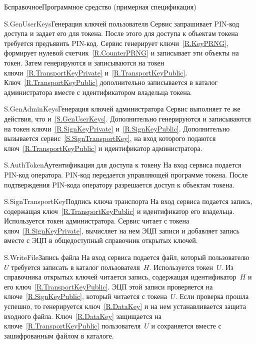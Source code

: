 \begin{appendix}{Б}{справочное}{Программное средство \CryptoDisk 
(примерная спецификация)}
\begin{definition}{S.GenUserKeys}{Генерация ключей пользователя}
Сервис запрашивает PIN-код доступа и задает его для токена.
После этого для доступа к объектам токена требуется предъявить PIN-код.
%
Сервис генерирует ключи~\ref{R.KeyPRNG}, 
формирует нулевой счетчик~\ref{R.CounterPRNG}
и записывает эти объекты на токен. 
Затем генерируются и записываются на токен ключи~\ref{R.TransportKeyPrivate}
и~\ref{R.TransportKeyPublic}.
%
Ключ~\ref{R.TransportKeyPublic} дополнительно записывается 
в каталог администратора вместе с идентификатором владельца токена.
\end{definition}

\begin{definition}{S.GenAdminKeys}{Генерация ключей администратора}
Сервис выполняет те же действия, что и~\ref{S.GenUserKeys}.
Дополнительно генерируются и записываются на токен ключи~\ref{R.SignKeyPrivate}
и~\ref{R.SignKeyPublic}. Дополнительно вызывается 
сервис~\ref{S.SignTransportKey}, на вход которого подаются
ключ~\ref{R.TransportKeyPublic} и идентификатор администратора.
\end{definition}

\clearpage
\begin{definition}{S.AuthToken}{Аутентификация для доступа к токену}
На вход сервиса подается PIN-код оператора.
PIN-код передается управляющей программе токена. 
После подтверждения PIN-кода оператору разрешается доступ к объектам токена.
\end{definition}

\begin{definition}{S.SignTransportKey}{Подпись ключа транспорта}
На вход сервиса подается запись,
содержащая ключ~\ref{R.TransportKeyPublic}
и идентификатор его владельца.
%
Используется токен администратора.
%
Сервис читает с токена ключ~\ref{R.SignKeyPrivate},
вычисляет на нем ЭЦП записи и добавляет запись вместе с ЭЦП 
в общедоступный справочник открытых ключей.
\end{definition}

\begin{definition}{S.WriteFile}{Запись файла}
На вход сервиса подается файл, который пользователю~$U$
требуется записать в каталог пользователя~$H$.
%
Используется токен~$U$.
Из справочника открытых ключей читается запись,
содержащая идентификатор~$H$ и его ключ~\ref{R.TransportKeyPublic}.
ЭЦП этой записи проверяется на ключе~\ref{R.SignKeyPublic},
который читается с токена~$U$. 
Если проверка прошла успешно, 
то генерируется ключ~\ref{R.DataKey} и на нем устанавливается 
защита входного файла.
%
Ключ~\ref{R.DataKey} защищается на ключе~\ref{R.TransportKeyPublic}
пользователя~$U$ и сохраняется вместе с зашифрованным файлом в каталоге. 
\end{definition}


\end{appendix}
